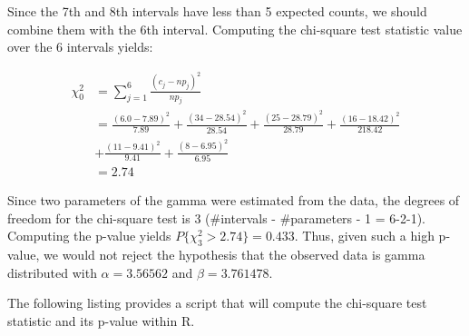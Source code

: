 \documentclass[
]{book}
\theoremstyle{definition}
\theoremstyle{definition}
\theoremstyle{definition}
\theoremstyle{definition}
\theoremstyle{remark}
\begin{document}
Since the 7th and 8th intervals have less than 5 expected counts, we should combine them with the 6th interval. Computing the chi-square test statistic value over the 6 intervals yields:

\[
\begin{aligned}
\chi^{2}_{0} & = \sum\limits_{j=1}^{6} \frac{\left( c_{j} - np_{j} \right)^{2}}{np_{j}}\\
 & = \frac{\left( 6.0 - 7.89\right)^{2}}{7.89} + \frac{\left(34-28.54\right)^{2}}{28.54} + \frac{\left(25-28.79\right)^{2}}{28.79} + \frac{\left(16-18.42\right)^{2}}{218.42} \\
 & + \frac{\left(11-9.41\right)^{2}}{9.41} + \frac{\left(8-6.95\right)^{2}}{6.95} \\
 & = 2.74
\end{aligned}
\]

Since two parameters of the gamma were estimated from the data, the
degrees of freedom for the chi-square test is 3 (\#intervals -
\#parameters - 1 = 6-2-1). Computing the p-value yields
\(P\{\chi^{2}_{3} > 2.74\} = 0.433\). Thus, given such a high p-value, we
would not reject the hypothesis that the observed data is gamma
distributed with \(\alpha = 3.56562\) and \(\beta = 3.761478\).

The following listing provides a script that will compute the chi-square
test statistic and its p-value within R.
\end{document}
